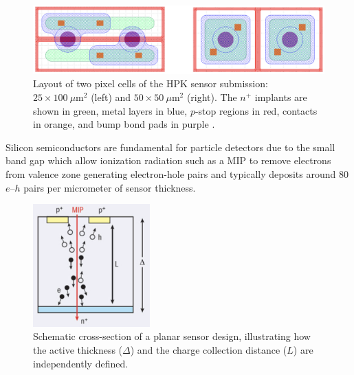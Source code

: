 \begin{figure}[H]
    \centering
    \includegraphics[width=1\textwidth]{images/pixels.png}
    \caption{Layout of two pixel cells of the HPK sensor submission: $25 \times 100~\mu\text{m}^2$ (left) and $50 \times 50~\mu\text{m}^2$ (right). The $n^+$ implants are shown in green, metal layers in blue, $p$-stop regions in red, contacts in orange, and bump bond pads in purple \cite{CERN-LHCC-2017-009}.}
    \label{fig:pixel_sensors}
\end{figure}

Silicon semiconductors are fundamental for particle detectors due to the small band gap which allow ionization radiation such as a MIP to remove electrons from valence zone generating electron-hole pairs and typically deposits around 80 $e$--$h$ pairs per micrometer of sensor thickness.

\begin{figure}[H]
    \centering
    \includegraphics[width=0.4\textwidth]{images/planar_sensor.png}
    \caption{Schematic cross-section of a planar sensor design, illustrating how the active thickness ($\Delta$) and the charge collection distance ($L$) are independently defined.}
    \label{fig:planar_sensor}
\end{figure}

